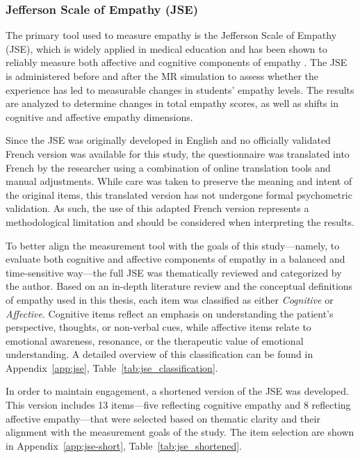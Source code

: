 \subsubsection{Jefferson Scale of Empathy (JSE)}
\label{sec:jse}

The primary tool used to measure empathy is the Jefferson Scale of Empathy (JSE), which is widely applied in medical education and has been shown to reliably measure both affective and cognitive components of empathy \cite{Hojat2002}. The JSE is administered before and after the MR simulation to assess whether the experience has led to measurable changes in students’ empathy levels. The results are analyzed to determine changes in total empathy scores, as well as shifts in cognitive and affective empathy dimensions.

Since the JSE was originally developed in English and no officially validated French version was available for this study, the questionnaire was translated into French by the researcher using a combination of online translation tools and manual adjustments. While care was taken to preserve the meaning and intent of the original items, this translated version has not undergone formal psychometric validation. As such, the use of this adapted French version represents a methodological limitation and should be considered when interpreting the results.

To better align the measurement tool with the goals of this study—namely, to evaluate both cognitive and affective components of empathy in a balanced and time-sensitive way—the full JSE was thematically reviewed and categorized by the author. Based on an in-depth literature review and the conceptual definitions of empathy used in this thesis, each item was classified as either \textit{Cognitive} or \textit{Affective}. Cognitive items reflect an emphasis on understanding the patient’s perspective, thoughts, or non-verbal cues, while affective items relate to emotional awareness, resonance, or the therapeutic value of emotional understanding. A detailed overview of this classification can be found in Appendix~\ref{app:jse}, Table~\ref{tab:jse_classification}.

In order to maintain engagement, a shortened version of the JSE was developed. This version includes 13 items—five reflecting cognitive empathy and 8 reflecting affective empathy—that were selected based on thematic clarity and their alignment with the measurement goals of the study. The item selection are shown in Appendix~\ref{app:jse-short}, Table~\ref{tab:jse_shortened}. %

